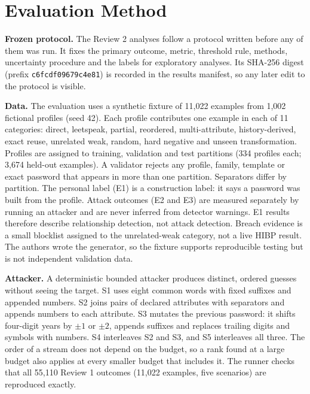 \documentclass[conference]{IEEEtran}
\begin{document}
\section{Evaluation Method}
\label{sec:method}
\textbf{Frozen protocol.} The Review 2 analyses follow a protocol written before any of them was run. It fixes the primary outcome, metric, threshold rule, methods, uncertainty procedure and the labels for exploratory analyses. Its SHA-256 digest (prefix \texttt{c6fcdf09679c4e81}) is recorded in the results manifest, so any later edit to the protocol is visible.

\textbf{Data.} The evaluation uses a synthetic fixture of 11,022 examples from 1,002 fictional profiles (seed 42). Each profile contributes one example in each of 11 categories: direct, leetspeak, partial, reordered, multi-attribute, history-derived, exact reuse, unrelated weak, random, hard negative and unseen transformation. Profiles are assigned to training, validation and test partitions (334 profiles each; 3,674 held-out examples). A validator rejects any profile, family, template or exact password that appears in more than one partition. Separators differ by partition. The personal label (E1) is a construction label: it says a password was built from the profile. Attack outcomes (E2 and E3) are measured separately by running an attacker and are never inferred from detector warnings. E1 results therefore describe relationship detection, not attack detection. Breach evidence is a small blocklist assigned to the unrelated-weak category, not a live HIBP result. The authors wrote the generator, so the fixture supports reproducible testing but is not independent validation data.

\textbf{Attacker.} A deterministic bounded attacker produces distinct, ordered guesses without seeing the target. S1 uses eight common words with fixed suffixes and appended numbers. S2 joins pairs of declared attributes with separators and appends numbers to each attribute. S3 mutates the previous password: it shifts four-digit years by $\pm 1$ or $\pm 2$, appends suffixes and replaces trailing digits and symbols with numbers. S4 interleaves S2 and S3, and S5 interleaves all three. The order of a stream does not depend on the budget, so a rank found at a large budget also applies at every smaller budget that includes it. The runner checks that all 55,110 Review 1 outcomes (11,022 examples, five scenarios) are reproduced exactly.
\end{document}
